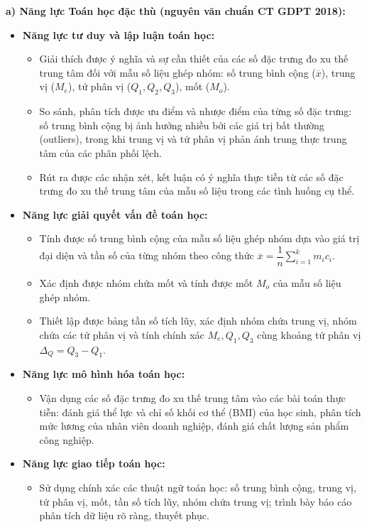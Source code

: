 \documentclass[12pt, a4paper]{article}
\begin{document}
\textbf{a) Năng lực Toán học đặc thù (nguyên văn chuẩn CT GDPT 2018):}
\begin{itemize}[leftmargin=1.5em]
    \item \textbf{Năng lực tư duy và lập luận toán học:}
    \begin{itemize}
        \item Giải thích được ý nghĩa và sự cần thiết của các số đặc trưng đo xu thế trung tâm đối với mẫu số liệu ghép nhóm: số trung bình cộng ($\overline{x}$), trung vị ($M_e$), tứ phân vị ($Q_1, Q_2, Q_3$), mốt ($M_o$).
        \item So sánh, phân tích được ưu điểm và nhược điểm của từng số đặc trưng: số trung bình cộng bị ảnh hưởng nhiều bởi các giá trị bất thường (outliers), trong khi trung vị và tứ phân vị phản ánh trung thực trung tâm của các phân phối lệch.
        \item Rút ra được các nhận xét, kết luận có ý nghĩa thực tiễn từ các số đặc trưng đo xu thế trung tâm của mẫu số liệu trong các tình huống cụ thể.
    \end{itemize}
    \item \textbf{Năng lực giải quyết vấn đề toán học:}
    \begin{itemize}
        \item Tính được số trung bình cộng của mẫu số liệu ghép nhóm dựa vào giá trị đại diện và tần số của từng nhóm theo công thức $\overline{x} = \dfrac{1}{n} \sum_{i=1}^k m_i c_i$.
        \item Xác định được nhóm chứa mốt và tính được mốt $M_o$ của mẫu số liệu ghép nhóm.
        \item Thiết lập được bảng tần số tích lũy, xác định nhóm chứa trung vị, nhóm chứa các tứ phân vị và tính chính xác $M_e, Q_1, Q_3$ cùng khoảng tứ phân vị $\Delta_Q = Q_3 - Q_1$.
    \end{itemize}
    \item \textbf{Năng lực mô hình hóa toán học:}
    \begin{itemize}
        \item Vận dụng các số đặc trưng đo xu thế trung tâm vào các bài toán thực tiễn: đánh giá thể lực và chỉ số khối cơ thể (BMI) của học sinh, phân tích mức lương của nhân viên doanh nghiệp, đánh giá chất lượng sản phẩm công nghiệp.
    \end{itemize}
    \item \textbf{Năng lực giao tiếp toán học:}
    \begin{itemize}
        \item Sử dụng chính xác các thuật ngữ toán học: số trung bình cộng, trung vị, tứ phân vị, mốt, tần số tích lũy, nhóm chứa trung vị; trình bày báo cáo phân tích dữ liệu rõ ràng, thuyết phục.

\end{itemize}
\end{itemize}
\end{document}
